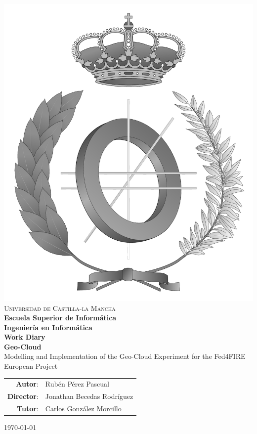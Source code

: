 \documentclass[a4paper,spanish,11pt,twoside]{article}
\begin{document}
\renewcommand*{\thepage}{\roman{page}}
\begin{titlepage}
\begin{center}
  \includegraphics[width=.3\textwidth]{logos/emblema_informatica-gray.pdf} \\
  \vspace*{0,5cm} {\Large \textsc{Universidad de Castilla-la Mancha\\}}
  \vspace{3mm}
  {\Large \textbf{Escuela Superior de Informática}}  \\
  \vspace{1,3cm}
  {\Large \textbf{Ingeniería en Informática}}\\
  \vspace{1cm}
  {\Large \textbf{Work Diary}} \\
  \vspace{1,3cm}
  \LARGE{\textbf{Geo-Cloud}\\Modelling and Implementation of the Geo-Cloud Experiment for the Fed4FIRE European Project}

\end{center}
\vspace{1.0cm}
\begin{table}[!h]
  \Large
  \begin{tabular}{rl}
      \textbf{Autor}: & Rubén Pérez Pascual \\
      \textbf{Director}: & Jonathan Becedas Rodríguez \\
      \textbf{Tutor}: & Carlos González Morcillo
  \end{tabular}
\end{table}
\begin{flushright}
{\large \today}
\end{flushright}
\end{titlepage}
\end{document}

